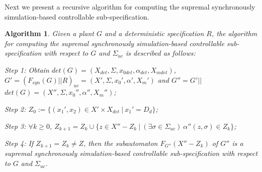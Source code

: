 \documentclass[preprint,authoryear,12pt]{elsarticle}
\newtheorem{Algorithm}{Algorithm}
\begin{document}
Next we present a recursive algorithm for computing the supremal
synchronously simulation-based controllable sub-specification.

\begin{Algorithm}\label{alg2}
Given a plant $G$ and a deterministic specification $R$, the
algorithm for computing the supremal synchronously
simulation-based controllable sub-specification with respect to
$G$ and $\Sigma_{uc}$ is described as follows:

Step 1: Obtain $det(G)=(X_{det}, \Sigma, x_{0det}, \alpha_{det},
X_{mdet})$, $G'=(F_{syn}(G)||R)_{uc}=(X', \Sigma, x_{0}', \alpha',
X_{m}')$ and $G''=G'||$ $det(G)=(X'', \Sigma, x_{0}'', \alpha'',
X_{m}'')$;

Step 2: $Z_0:=\{(x_1', x_2) \in X' \times X_{det}~|~x_1'=D_d\}$;

Step 3: $\forall k \geq 0$, $Z_{k+1}=Z_{k} \cup \{z \in
X''-Z_{k}~|~(\exists \sigma \in \Sigma_{uc}) ~ \alpha''(z, \sigma)
\in Z_{k} \}$;

Step 4: If $Z_{k+1}=Z_{k} \neq Z$, then the subautomaton
$F_{G''}(X''-Z_{k})$ of $G''$ is a supremal synchronously
simulation-based controllable sub-specification with respect to
$G$ and $\Sigma_{uc}$.
\end{Algorithm}
\end{document}
